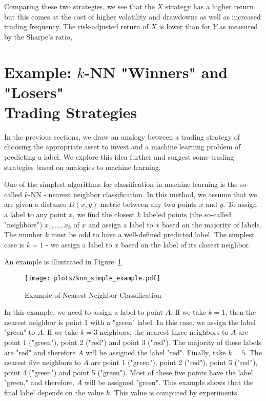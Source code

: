 \documentclass{article}
\begin{document}
Comparing these two strategies, we see that the $X$ strategy has a higher return but this comes at the cost of higher volatility and drawdowns as well as increased trading frequency. The risk-adjusted return of $X$ is lower than for $Y$ as measured by the Sharpe's ratio,

\section{Example: $k$-NN "Winners" and "Losers"  \\ Trading  Strategies}
\label{section_example_knn_strategies}

In the previous sections, we draw an analogy between a trading strategy of choosing the appropriate asset to invest
and a machine learning problem of predicting a label. We explore this idea further and suggest some trading strategies based on analogies to machine learning.

One of the simplest algorithms for classification in machine learning is the so-called $k$-NN - nearest neighbor classification.
In this method, we assume that we are given a distance $D(x,y)$ metric between any two points $x$ and $y$. To assign a label to
any point $x$, we find the closest $k$ labeled points (the so-called "neighbors") $x_{1},\ldots, x_{k}$ of $x$
and assign a label to $x$ based on the majority of labels. The number $k$ must be odd to have a well-defined predicted label.
The simplest case is $k=1$ - we assign a label to $x$ based on the label of its closest neighbor.

An example is illustrated in Figure~\ref{fig:knn_picture}.
\begin{figure}[h!]
  \centering
  \texttt{[image: plots/knn\_simple\_example.pdf]} 
  \caption{Example of Nearest Neighbor Classification}
  \label{fig:knn_picture}
\end{figure}
In this example, we need to assign a label to point $A$. If we take $k=1$, then the nearest neighbor is point
1 with a "green" label. In this case, we assign the label "green" to $A$. 
If we take $k=3$ neighbors, the nearest three neighbors to $A$ are 
point 1 ("green"),  point 2 ("red") and point 3 ("red"). The majority of these labels are "red" and therefore $A$ 
will be assigned the label "red". Finally, take $k=5$.  The nearest five neighbors to $A$ are point
1 ("green"),  point 2 ("red"), point 3 ("red"), point 4 ("green") and point 5 ("green"). Most of these five points
have the label "green," and therefore, $A$ will be assigned "green".  This example shows that the final label depends on the value $k$.
This value is computed by experiments.
\end{document}
